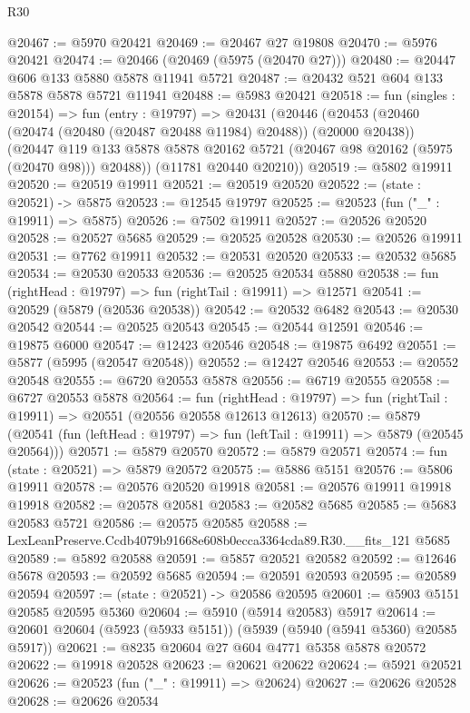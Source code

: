 \begin{lexlean}{R30}
\begin{coremodule}
@20467 := @5970 @20421
@20469 := @20467 @27 @19808
@20470 := @5976 @20421
@20474 := @20466 (@20469 (@5975 (@20470 @27)))
@20480 := @20447 @606 @133 @5880 @5878 @11941 @5721
@20487 := @20432 @521 @604 @133 @5878 @5878 @5721 @11941
@20488 := @5983 @20421
@20518 := fun (singles : @20154) =>
  fun (entry : @19797) =>
  @20431
    (@20446
      (@20453
        (@20460 (@20474 (@20480 (@20487 @20488 @11984) @20488)) (@20000 @20438))
        (@20447 @119 @133 @5878 @5878 @20162 @5721 (@20467 @98 @20162 (@5975 (@20470 @98))) @20488))
      (@11781 @20440 @20210))
@20519 := @5802 @19911
@20520 := @20519 @19911
@20521 := @20519 @20520
@20522 := (state : @20521) -> @5875
@20523 := @12545 @19797
@20525 := @20523 (fun ("_" : @19911) => @5875)
@20526 := @7502 @19911
@20527 := @20526 @20520
@20528 := @20527 @5685
@20529 := @20525 @20528
@20530 := @20526 @19911
@20531 := @7762 @19911
@20532 := @20531 @20520
@20533 := @20532 @5685
@20534 := @20530 @20533
@20536 := @20525 @20534 @5880
@20538 := fun (rightHead : @19797) => fun (rightTail : @19911) => @12571
@20541 := @20529 (@5879 (@20536 @20538))
@20542 := @20532 @6482
@20543 := @20530 @20542
@20544 := @20525 @20543
@20545 := @20544 @12591
@20546 := @19875 @6000
@20547 := @12423 @20546
@20548 := @19875 @6492
@20551 := @5877 (@5995 (@20547 @20548))
@20552 := @12427 @20546
@20553 := @20552 @20548
@20555 := @6720 @20553 @5878
@20556 := @6719 @20555
@20558 := @6727 @20553 @5878
@20564 := fun (rightHead : @19797) =>
  fun (rightTail : @19911) => @20551 (@20556 @20558 @12613 @12613)
@20570 := @5879
    (@20541 (fun (leftHead : @19797) => fun (leftTail : @19911) => @5879 (@20545 @20564)))
@20571 := @5879 @20570
@20572 := @5879 @20571
@20574 := fun (state : @20521) => @5879 @20572
@20575 := @5886 @5151
@20576 := @5806 @19911
@20578 := @20576 @20520 @19918
@20581 := @20576 @19911 @19918 @19918
@20582 := @20578 @20581
@20583 := @20582 @5685
@20585 := @5683 @20583 @5721
@20586 := @20575 @20585
@20588 := LexLeanPreserve.Ccdb4079b91668e608b0ecca3364cda89.R30.__fits_121 @5685
@20589 := @5892 @20588
@20591 := @5857 @20521 @20582
@20592 := @12646 @5678
@20593 := @20592 @5685
@20594 := @20591 @20593
@20595 := @20589 @20594
@20597 := (state : @20521) -> @20586 @20595
@20601 := @5903 @5151 @20585 @20595 @5360
@20604 := @5910 (@5914 @20583) @5917
@20614 := @20601 @20604 (@5923 (@5933 @5151)) (@5939 (@5940 (@5941 @5360) @20585 @5917))
@20621 := @8235 @20604 @27 @604 @4771 @5358 @5878 @20572
@20622 := @19918 @20528
@20623 := @20621 @20622
@20624 := @5921 @20521
@20626 := @20523 (fun ("_" : @19911) => @20624)
@20627 := @20626 @20528
@20628 := @20626 @20534

\end{coremodule}
\end{lexlean}
